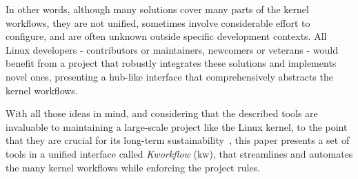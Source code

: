 In other words, although many solutions cover many parts of the kernel
workflows, they are not unified, sometimes involve considerable effort to
configure, and are often unknown outside specific development contexts. All
Linux developers - contributors or maintainers, newcomers or veterans - would
benefit from a project that robustly integrates these solutions and implements
novel ones, presenting a hub-like interface that comprehensively abstracts the
kernel workflows.

With all those ideas in mind, and considering that the described tools are
invaluable to maintaining a large-scale project like the Linux kernel, to the
point that they are crucial for its long-term
sustainability~\cite{corbet-gregkh2017-linuxreport}, this paper presents a set
of tools in a unified interface called \textit{Kworkflow} (kw), that streamlines
and automates the many kernel workflows while enforcing the project rules.

